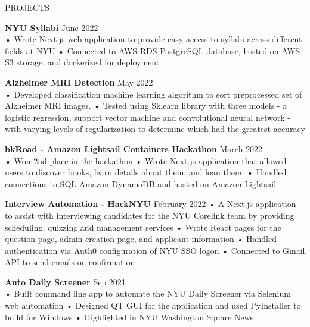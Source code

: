 \documentclass{resume} %
\begin{document}
\begin{rSection}{PROJECTS}

\textbf{\bf NYU Syllabi } \hfill June 2022 \\
• Wrote Next.js web application to provide easy access to syllabi across different fields at NYU \newline
• Connected to AWS RDS PostgreSQL database, hosted on AWS S3 storage, and dockerized for deployment

\textbf{\bf Alzheimer MRI Detection } \hfill May 2022 \\
• Developed classification machine learning algorithm to sort preprocessed set of Alzheimer MRI images. 
\newline
• Tested using Sklearn library with three models - a logistic regression, support vector machine and convolutional neural network - with varying levels of regularization to determine which had the greatest accuracy 

\textbf{\bf bkRoad - Amazon Lightsail Containers Hackathon } \hfill March 2022 \\
• Won 2nd place in the hackathon \newline
• Wrote Next.js application that allowed users to discover books, learn details about them, and loan them. \newline
• Handled connections to SQL Amazon DynamoDB and hosted on Amazon Lightsail

\textbf{\bf Interview Automation - HackNYU} \hfill February 2022 \newline
• A Next.js application to assist with interviewing candidates for the NYU Corelink team by providing scheduling, quizzing and management services\newline
• Wrote React pages for the question page, admin creation page, and applicant information \newline
• Handled authentication via Auth0 configuration of NYU SSO logon  \newline
• Connected to Gmail API to send emails on confirmation

\textbf{\bf Auto Daily Screener } \hfill Sep 2021 \\
• Built command line app to automate the NYU Daily Screener via Selenium web automation
\newline
• Designed QT GUI for the application and used PyInstaller to build for Windows \newline
• Highlighted in NYU Washington Square News



\end{rSection}
\end{document}
